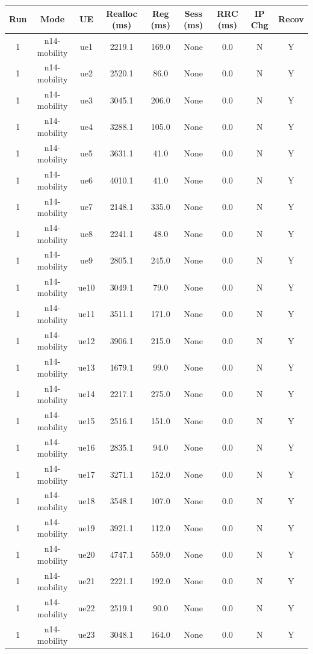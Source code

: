 \begin{table}[ht]
\centering
\begin{tabular}{|c|c|c|c|c|c|c|c|c|}
\hline
Run & Mode & UE & Realloc (ms) & Reg (ms) & Sess (ms) & RRC (ms) & IP Chg & Recov \\
\hline
1 & n14-mobility & ue1 & 2219.1 & 169.0 & None & 0.0 & N & Y \\
1 & n14-mobility & ue2 & 2520.1 & 86.0 & None & 0.0 & N & Y \\
1 & n14-mobility & ue3 & 3045.1 & 206.0 & None & 0.0 & N & Y \\
1 & n14-mobility & ue4 & 3288.1 & 105.0 & None & 0.0 & N & Y \\
1 & n14-mobility & ue5 & 3631.1 & 41.0 & None & 0.0 & N & Y \\
1 & n14-mobility & ue6 & 4010.1 & 41.0 & None & 0.0 & N & Y \\
1 & n14-mobility & ue7 & 2148.1 & 335.0 & None & 0.0 & N & Y \\
1 & n14-mobility & ue8 & 2241.1 & 48.0 & None & 0.0 & N & Y \\
1 & n14-mobility & ue9 & 2805.1 & 245.0 & None & 0.0 & N & Y \\
1 & n14-mobility & ue10 & 3049.1 & 79.0 & None & 0.0 & N & Y \\
1 & n14-mobility & ue11 & 3511.1 & 171.0 & None & 0.0 & N & Y \\
1 & n14-mobility & ue12 & 3906.1 & 215.0 & None & 0.0 & N & Y \\
1 & n14-mobility & ue13 & 1679.1 & 99.0 & None & 0.0 & N & Y \\
1 & n14-mobility & ue14 & 2217.1 & 275.0 & None & 0.0 & N & Y \\
1 & n14-mobility & ue15 & 2516.1 & 151.0 & None & 0.0 & N & Y \\
1 & n14-mobility & ue16 & 2835.1 & 94.0 & None & 0.0 & N & Y \\
1 & n14-mobility & ue17 & 3271.1 & 152.0 & None & 0.0 & N & Y \\
1 & n14-mobility & ue18 & 3548.1 & 107.0 & None & 0.0 & N & Y \\
1 & n14-mobility & ue19 & 3921.1 & 112.0 & None & 0.0 & N & Y \\
1 & n14-mobility & ue20 & 4747.1 & 559.0 & None & 0.0 & N & Y \\
1 & n14-mobility & ue21 & 2221.1 & 192.0 & None & 0.0 & N & Y \\
1 & n14-mobility & ue22 & 2519.1 & 90.0 & None & 0.0 & N & Y \\
1 & n14-mobility & ue23 & 3048.1 & 164.0 & None & 0.0 & N & Y \\

\end{tabular}
\end{table}
